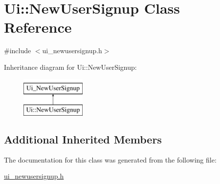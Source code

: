 \hypertarget{classUi_1_1NewUserSignup}{\section{Ui\-:\-:New\-User\-Signup Class Reference}
\label{classUi_1_1NewUserSignup}
}


{\ttfamily \#include $<$ui\-\_\-newusersignup.\-h$>$}

Inheritance diagram for Ui\-:\-:New\-User\-Signup\-:\begin{figure}[H]
\begin{center}
\leavevmode
\includegraphics[height=2.000000cm]{classUi_1_1NewUserSignup}
\end{center}
\end{figure}
\subsection*{Additional Inherited Members}


The documentation for this class was generated from the following file\-:\begin{DoxyCompactItemize}
\item 
\hyperlink{ui__newusersignup_8h}{ui\-\_\-newusersignup.\-h}\end{DoxyCompactItemize}
